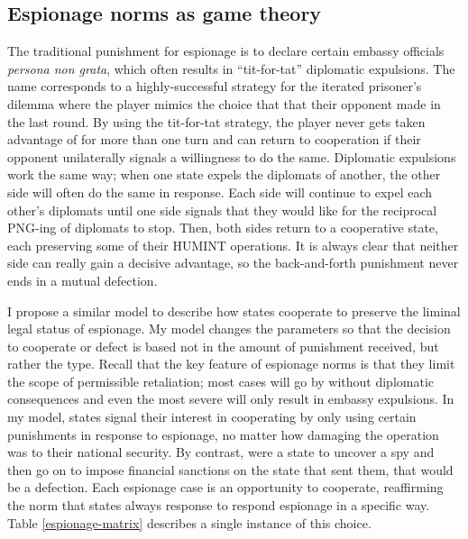 \documentclass[11pt]{memoir}
\begin{document}
\begin{refsegment}
\subsection{Espionage norms as game theory}
The traditional punishment for espionage is to declare certain embassy officials \emph{persona non grata}, which often results in ``tit-for-tat'' diplomatic expulsions. The name corresponds to a highly-successful strategy for the iterated prisoner's dilemma where the player mimics the choice that that their opponent made in the last round. By using the tit-for-tat strategy, the player never gets taken advantage of for more than one turn and can return to cooperation if their opponent unilaterally signals a willingness to do the same. Diplomatic expulsions work the same way; when one state expels the diplomats of another, the other side will often do the same in response. Each side will continue to expel each other's diplomats until one side signals that they would like for the reciprocal PNG-ing of diplomats to stop. Then, both sides return to a cooperative state, each preserving some of their HUMINT operations. It is always clear that neither side can really gain a decisive advantage, so the back-and-forth punishment never ends in a mutual defection.

I propose a similar model to describe how states cooperate to preserve the liminal legal status of espionage. My model changes the parameters so that the decision to cooperate or defect is based not in the amount of punishment received, but rather the type. Recall that the key feature of espionage norms is that they limit the scope of permissible retaliation; most cases will go by without diplomatic consequences and even the most severe will only result in embassy expulsions. In my model, states signal their interest in cooperating by only using certain punishments in response to espionage, no matter how damaging the operation was to their national security. By contrast, were a state to uncover a spy and then go on to impose financial sanctions on the state that sent them, that would be a defection. Each espionage case is an opportunity to cooperate, reaffirming the norm that states always response to respond espionage in a specific way. Table \ref{espionage-matrix} describes a single instance of this choice.


\end{refsegment}
\end{document}
